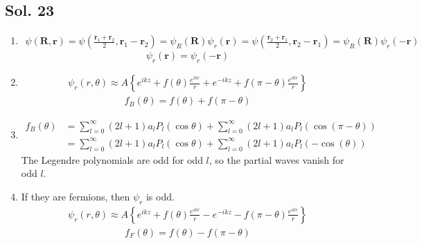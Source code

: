 \subsection*{Sol. 23}
\begin{enumerate}
    \item \begin{align*}
              \psi(\bm R, \bm r)
              =\psi(\frac{\bm r_1 + \bm r_2}{2},
              \bm r_1 - \bm r_2) = \psi_R(\bm R)\psi_r(\bm r)
              =\psi(\frac{\bm r_2 + \bm r_1}{2},
              \bm r_2 - \bm r_1) = \psi_R(\bm R)\psi_r(-\bm r)
          \end{align*}
          $$
              \psi_r(\bm r) = \psi_r(-\bm r)
          $$
    \item
          \begin{align*}
              \psi_r(r,\theta)
              \approx A
              \left\{
              e^{ikz} + f(\theta)\frac{e^{ikr}}{r}
              +
              e^{-ikz} + f(\pi - \theta)\frac{e^{ikr}}{r}
              \right\}
          \end{align*}
          \begin{align*}
              f_B(\theta) = f(\theta) + f(\pi - \theta)
          \end{align*}
    \item
          \begin{align*}
              f_B(\theta) & =\sum_{l=0}^\infty (2l+1)a_l P_l(\cos\theta) +
              \sum_{l=0}^\infty (2l+1)a_l P_l(\cos(\pi - \theta)) \\
                          & =
              \sum_{l=0}^\infty (2l+1)a_l P_l(\cos\theta) +
              \sum_{l=0}^\infty (2l+1)a_l P_l(-\cos(\theta))
          \end{align*}
          The Legendre polynomials are odd for odd $l$, so the partial waves vanish for odd $l$.
    \item If they are fermions, then $\psi_r$ is odd.
          \begin{align*}
              \psi_r(r,\theta)
              \approx A
              \left\{
              e^{ikz} + f(\theta)\frac{e^{ikr}}{r}
              -
              e^{-ikz} - f(\pi - \theta)\frac{e^{ikr}}{r}
              \right\}
          \end{align*}
          \begin{align*}
              f_F(\theta) = f(\theta) - f(\pi - \theta)
          \end{align*}
          \begin{align*}

\end{align*}
\end{enumerate}
